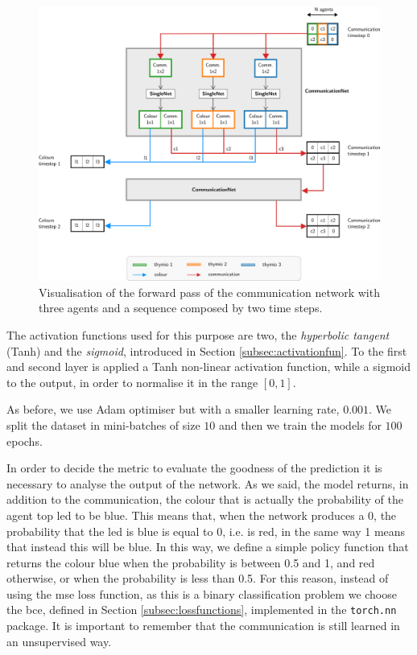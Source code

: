 \begin{figure}[!htb]
	\centering
	\includegraphics[width=\textwidth]{contents/images/commnettask2}
	\caption[Communication network of the second task.]{Visualisation of the 
		forward pass of the communication network with three agents and a 
		sequence 
		composed by two time steps.}
	\label{fig:commnet2}
\end{figure}

The activation functions used for this purpose are two,  the \emph{hyperbolic 
tangent} (Tanh) and the \emph{sigmoid}, introduced in Section 
\ref{subsec:activationfun}.
To the first and second layer is applied a Tanh non-linear activation function, 
while a sigmoid to the output, in order to normalise it in the range $[0, 1]$.


As before, we use Adam optimiser but with a smaller learning rate, $0.001$. 
We split the dataset in mini-batches of size $10$ and then we train the models for 
$100$ epochs. 

In order to decide the metric to evaluate the goodness of the prediction it is 
necessary to analyse the output of the network. As we said, the model returns, in 
addition to the communication, the colour that is actually the probability of the 
agent top \gls{led} to be blue. This means that, when the network produces a 0, 
the probability that the \gls{led} is blue is equal to 0, i.e. is red, in the same way 1 
means that instead this will be blue. In this way, we define a simple policy function 
that returns the colour blue when the probability is between 0.5 and 1, and red 
otherwise, or when the probability is less than 0.5.
For this reason, instead of using the \gls{mse} loss function, as this is a binary 
classification problem we choose the \gls{bce}, defined in Section 
\ref{subsec:lossfunctions}, implemented in the \texttt{torch.nn} package.
It is important to remember that the communication is still learned in an 
unsupervised way.

